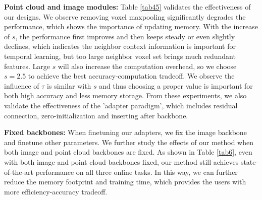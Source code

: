 \textbf{Point cloud and image modules:} Table \ref{tab45} validates the effectiveness of our designs. We observe removing voxel maxpooling significantly degrades the performance, which shows the importance of updating memory. With the increase of $s$, the performance first improves and then keeps steady or even slightly declines, which indicates the neighbor context information is important for temporal learning, but too large neighbor voxel set brings much redundant features. 
Large $s$ will also increase the computation overhead, so we choose $s=2.5$ to achieve the best accuracy-computation tradeoff.
We observe the influence of $\tau$ is similar with $s$ and thus choosing a proper value is important for both high accuracy and less memory storage. From these experiments, we also validate the effectiveness of the 'adapter paradigm', which includes residual connection, zero-initialization and inserting after backbone.


\textbf{Fixed backbones:} When finetuning our adapters, we fix the image backbone and finetune other parameters. We further study the effects of our method when both image and point cloud backbones are fixed. As shown in Table \ref{tab6}, even with both image and point cloud backbones fixed, our method still achieves state-of-the-art performance on all three online tasks. In this way, we can further reduce the memory footprint and training time, which provides the users with more efficiency-accuracy tradeoff.